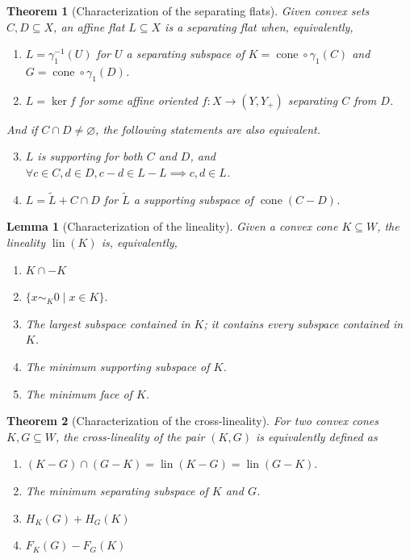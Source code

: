 \documentclass[10pt,a4paper]{amsart}
\newtheorem{lemma}{Lemma}
\newtheorem{theorem}{Theorem}
\DeclareMathOperator{\cone}{cone}
\DeclareMathOperator{\lin}{lin}
\begin{document}
\begin{theorem}[Characterization of the separating flats]
\label{loc:characterization_of_the_separating_flats.statement}
Given convex sets $C, D \subseteq X$, an affine flat $L \subseteq X$ is a separating flat when,
equivalently,
\begin{enumerate}
\item $L = \gamma_1^{-1}(U)$ for $U$ a separating subspace of $K = \cone \circ \gamma_1(C)$ and $G = \cone \circ \gamma_1(D)$.
\item $L = \ker f$ for some affine oriented $f:X \to (Y, Y_+)$ separating $C$ from $D$.
\end{enumerate}

And if $C \cap D \neq \varnothing$, the following statements are also equivalent.

\begin{enumerate}
\setcounter{enumi}{2}
\item $L$ is supporting for both $C$ and $D$, and $\forall c  \in C, d  \in D, c-d \in L-L \implies c,d \in L$.
\item $L =  \tilde{L} + C \cap D$ for $\tilde{L}$ a supporting subspace of $\cone(C-D)$.
\end{enumerate}
\end{theorem}

\begin{lemma}[Characterization of the lineality]
\label{loc:characterization_of_the_lineality.statement}
Given a convex cone $K \subseteq W$, the lineality $\lin(K)$ is, equivalently,
\begin{enumerate}
\item $K \cap -K$
\item $\{x \sim_{K} 0 \mid x \in K\}.$
\item The largest subspace contained in $K$; it contains every subspace contained in $K$. 
\item The minimum supporting subspace of $K$.
\item The minimum face of $K$.
\end{enumerate}
\end{lemma}

\begin{theorem}[Characterization of the cross-lineality]
\label{loc:cross_lineality.statement}
For two convex cones $K, G \subseteq W$, the \emph{cross-lineality} of the pair $(K, G)$ is equivalently defined as
\begin{enumerate}
\item $(K-G) \cap (G -K)=\lin(K-G)=\lin(G-K).$
\item The minimum separating subspace of $K$ and $G$.
\item $H_K(G)+ H_G(K)$
\item $F_K(G) - F_G(K)$
\end{enumerate}
\end{theorem}
\end{document}
